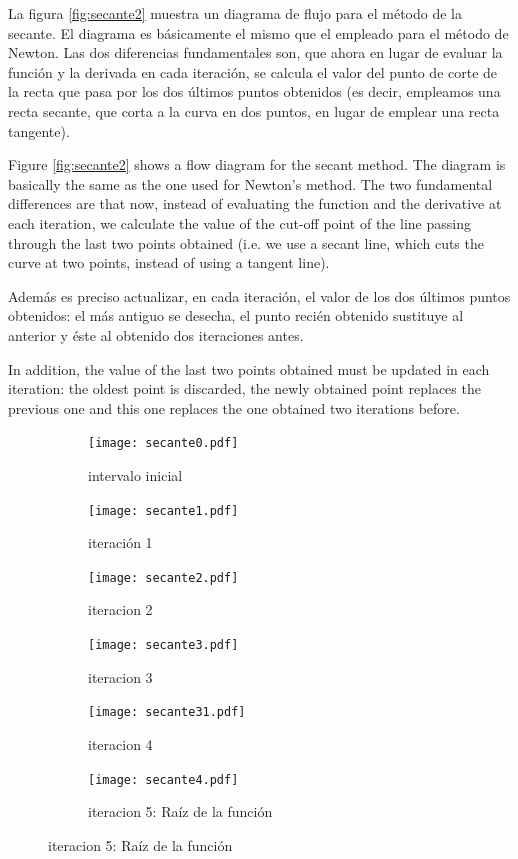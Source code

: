 \begin{paracol}{2}

La figura \ref{fig:secante2} muestra un diagrama de flujo para el método de la secante. El diagrama es básicamente el mismo que el empleado para el método de Newton. Las dos diferencias fundamentales son, que ahora en lugar de evaluar la función y la derivada en cada iteración, se calcula  el valor del punto de corte de la recta que pasa por los dos últimos puntos obtenidos (es decir, empleamos una recta secante, que corta a la curva en dos puntos, en lugar de emplear una recta tangente). 

\switchcolumn
Figure \ref{fig:secante2} shows a flow diagram for the secant method. The diagram is basically the same as the one used for Newton's method. The two fundamental differences are that now, instead of evaluating the function and the derivative at each iteration, we calculate the value of the cut-off point of the line passing through the last two points obtained (i.e. we use a secant line, which cuts the curve at two points, instead of using a tangent line). 

\switchcolumn

Además es preciso actualizar, en cada iteración, el valor de los dos últimos puntos obtenidos: el más antiguo se desecha, el punto recién obtenido sustituye al anterior y éste al obtenido dos iteraciones antes. 

\switchcolumn

In addition, the value of the last two points obtained must be updated in each iteration: the oldest point is discarded, the newly obtained point replaces the previous one and this one replaces the one obtained two iterations before. 


\end{paracol}
\begin{figure}
	\centering
	\begin{subfigure}{0.4\textwidth}
		{\texttt{[image: secante0.pdf]}}
		\caption{intervalo inicial}
	\end{subfigure}
	\begin{subfigure}{0.4\textwidth}
		{\texttt{[image: secante1.pdf]}}
		\caption{iteración 1}
	\end{subfigure}	
	\begin{subfigure}{0.4\textwidth}
		{\texttt{[image: secante2.pdf]}}
		\caption{iteracion 2}
	\end{subfigure}
	\begin{subfigure}{0.4\textwidth}
		{\texttt{[image: secante3.pdf]}}
		\caption{iteracion 3}
	\end{subfigure}
	\begin{subfigure}{0.4\textwidth}
		{\texttt{[image: secante31.pdf]}}
		\caption{iteracion 4}
	\end{subfigure}
    \begin{subfigure}{0.4\textwidth}
    	{\texttt{[image: secante4.pdf]}}
    	\caption{iteracion 5: Raíz de la función}
    \end{subfigure}
	\label{fig:secante3}
\end{figure}
